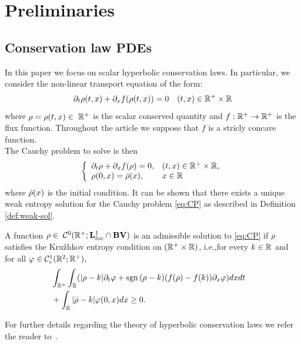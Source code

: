 \section{Preliminaries\label{sec:Preliminaries}}


\subsection{Conservation law PDEs\label{sub:Hyperbolic-PDE's}}

In this paper we focus on scalar hyperbolic conservation laws. In particular, we consider the non-linear transport equation of the form:
\begin{equation}
\partial_t\cvar\left(t,x\right)+\partial_x f\left(\cvar\left(t,x\right)\right)=0 \quad (t,x) \in \R^+ \times \R\label{eq:cons}
\end{equation}
where $\rho=\rho(t,x) \in \; \mathbb{R}^+$ is the scalar conserved quantity and $f:\mathbb{R}^+\rightarrow \mathbb{R}^+$ is the flux function. Throughout the article we suppose that $f$ is a stricly concave function. \\
The Cauchy problem to solve is then 
\begin{equation}
	\label{eq:CP}
		\left\{
		\begin{array}{ll}
		\partial_t \cvar+ \partial_x f(\cvar) =0, & (t,x)\in\R^+\times \R,\\
		\cvar(0,x)=\initstate(x), & x \in \R\\
		\end{array}
		\right.
\end{equation}
where $\bar{\rho}(x)$ is the initial condition.
It can be shown that there exists a unique weak entropy solution for the Cauchy problem \eqref{eq:CP} as described in Definition \ref{def:weak-sol}. 
\begin{defn}\label{def:weak-sol}
A function $\rho \in \; \mathcal{C}^0(\mathbb{R}^+; \mathbf{L}^1_{loc}\cap \mathbf{BV})$ is an admissible solution to \eqref{eq:CP} if $\rho$ satisfies the Kru\v{z}hkov entropy condition \cite{Kruzhkov} on $(\mathbb{R}^+\times\mathbb{R})$, i.e.,for every $k\in \mathbb{R}$ and for all $\varphi \in \mathcal{C}^1_c(\mathbb{R}^2;\mathbb{R}^+),$
\begin{eqnarray}
\label{eq:kruzhkov}
	&\int_{\R^+}\int_{\R}(\modulo{\cvar -k}  \partial_t \varphi + \sgn{(\cvar-k }) (f(\cvar)-f(k))\partial_x\varphi)dxdt& \nonumber\\
	 &+\int_{\R}\modulo{\initstate-k}\varphi(0,x)dx\geq 0.&
\end{eqnarray} 
\end{defn}
For further details regarding the theory of hyperbolic conservation laws we refer the reader to~\cite{garavello2006traffic,Evans1998}.

